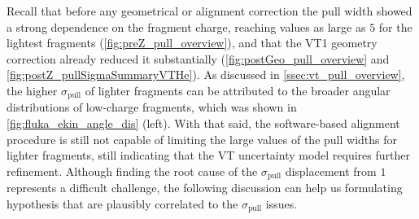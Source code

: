 Recall that before any geometrical or alignment correction the pull width showed a strong dependence on the fragment charge, reaching values as large as $5$ for the lightest fragments (\autoref{fig:preZ_pull_overview}), and that the VT1 geometry correction already reduced it substantially (\autoref{fig:postGeo_pull_overview} and \autoref{fig:postZ_pullSigmaSummaryVTHe}). As discussed in \autoref{ssec:vt_pull_overview}, the higher $\sigma_\text{pull}$ of lighter fragments can be attributed to the broader angular distributions of low-charge fragments, which was shown in \autoref{fig:fluka_ekin_angle_dis} (left). With that said, the software-based alignment procedure is still not capable of limiting the large values of the pull widths for lighter fragments, still indicating that the VT uncertainty model requires further refinement. Although finding the root cause of the $\sigma_\text{pull}$ displacement from $1$ represents a difficult challenge, the following discussion can help us formulating hypothesis that are plausibly correlated to the $\sigma_\text{pull}$ issues.

